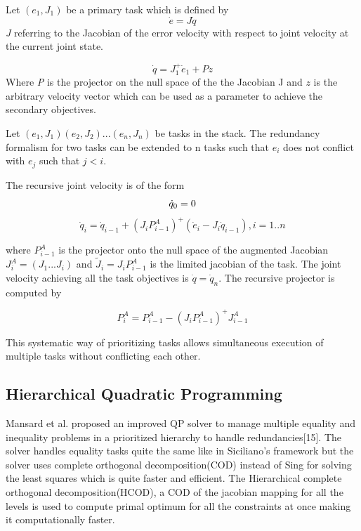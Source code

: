 Let $(e_{1},J_{1})$ be a primary task  which is defined by  
\begin{equation} \label{eq:tf1}
\dot{e} = J\dot{q} 
\end{equation}
 \textit{J} referring to the Jacobian of the error velocity with respect to joint velocity at the current joint state.


\begin{equation} \label{eq:tf3}
\dot{q} = J_{1}^{+}\dot{e}_{1} + Pz
\end{equation}
 Where \textit{P} is the projector on the null space of the the Jacobian J and \textit{ $z$ } is the arbitrary velocity vector which can be used as a parameter to achieve the secondary objectives. 

Let $(e_{1},J_{1})(e_{2},J_{2})...(e_{n},J_{n})$ be tasks in the stack. The redundancy formalism for two tasks can be extended to n tasks such that $e_{i}$ does not conflict with $e_{j}$ such that $j<i$. 


The recursive joint velocity is of the form
\begin{equation} \label{eq:ntasks}
  \dot{q}_{0} = 0\\
\end{equation}
\begin{equation}
  \dot{q}_{i} = \dot{q}_{i-1}+ (J_{i}P^{A}_{i-1})^{+}(\dot{e}_{i} - J_{i}\dot{q}_{i-1}), i= 1..n
\end{equation}



 where $P^{A}_{i-1}$ is the projector onto the null space of the augmented Jacobian $J_i^A = (J_1...J_i)$ and $\widetilde{J}_i = J_iP_{i-1}^A$ is the limited jacobian of the task. The joint velocity achieving all the task objectives is $\dot{q} = \dot{q}_n$. The recursive projector is computed by 
 
 \[P^A_i = P^A_{i-1} - (J_iP_{i-1}^A)^+J^A_{i-1}  \] 
 
 This systematic way of prioritizing tasks allows simultaneous execution of multiple tasks without conflicting each other.
 \subsection{Hierarchical Quadratic Programming}
Mansard et al. proposed an improved QP solver to manage multiple equality and inequality problems in a prioritized hierarchy to handle redundancies[15]. The solver handles equality tasks quite the same like in Siciliano's framework but the solver uses complete orthogonal decomposition(COD) instead of Sing for solving the least squares which is quite faster and efficient. The Hierarchical complete orthogonal decomposition(HCOD), a COD of the jacobian mapping for all the levels is used to compute primal optimum for all the constraints at once making it computationally faster. 

